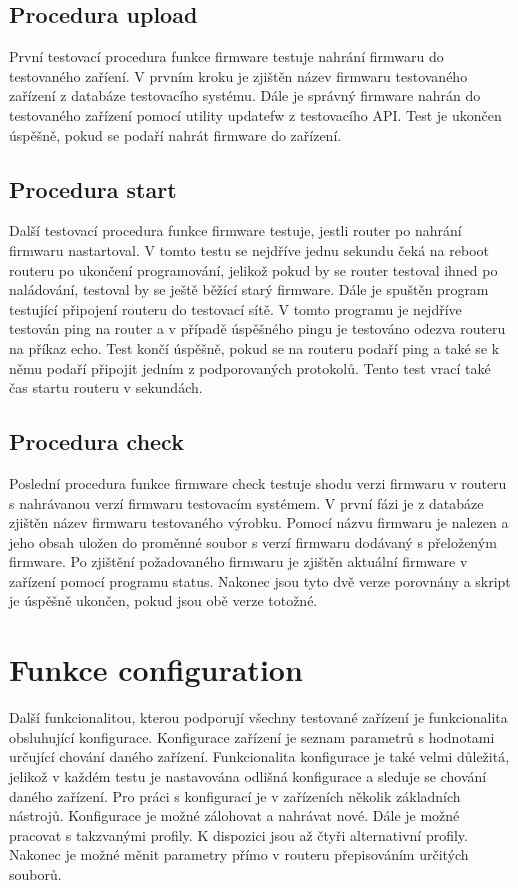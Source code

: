 \subsection{Procedura upload}
První testovací procedura funkce firmware testuje nahrání firmwaru do testovaného zaříení. V prvním kroku je zjištěn název firmwaru testovaného zařízení z databáze testovacího systému. Dále je správný firmware nahrán do testovaného zařízení pomocí utility updatefw z testovacího API. Test je ukončen úspěšně, pokud se podaří nahrát firmware do zařízení.

\subsection{Procedura start}
Další testovací procedura funkce firmware testuje, jestli router po nahrání firmwaru nastartoval. V tomto testu se nejdříve jednu sekundu čeká na reboot routeru po ukončení programování, jelikož pokud by se router testoval ihned po naládování, testoval by se ještě běžící starý firmware. Dále je spuštěn program testující připojení routeru do testovací sítě. V tomto programu je nejdříve testován ping na router a v případě úspěšného pingu je testováno odezva routeru na příkaz echo. Test končí úspěšně, pokud se na routeru podaří ping a také se k němu podaří připojit jedním z podporovaných protokolů. Tento test vrací také čas startu routeru v sekundách.

\subsection{Procedura check}
Poslední procedura funkce firmware check testuje shodu verzi firmwaru v routeru s nahrávanou verzí firmwaru testovacím systémem. V první fázi je z databáze zjištěn název firmwaru testovaného výrobku. Pomocí názvu firmwaru je nalezen a jeho obsah uložen do proměnné soubor s verzí firmwaru dodávaný s přeloženým firmware. Po zjištění požadovaného firmwaru je zjištěn aktuální firmware v zařízení pomocí programu status. Nakonec jsou tyto dvě verze porovnány a skript je úspěšně ukončen, pokud jsou obě verze totožné.

\section{Funkce configuration}
Další funkcionalitou, kterou podporují všechny testované zařízení je funkcionalita obsluhující konfigurace. Konfigurace zařízení je seznam parametrů s hodnotami určující chování daného zařízení. Funkcionalita konfigurace je také velmi důležitá, jelikož v každém testu je nastavována odlišná konfigurace a sleduje se chování daného zařízení. Pro práci s konfigurací je v zařízeních několik základních nástrojů. Konfigurace je možné zálohovat a nahrávat nové. Dále je možné pracovat s takzvanými profily. K dispozici jsou až čtyři alternativní profily. Nakonec je možné měnit parametry přímo v routeru přepisováním určitých souborů.

